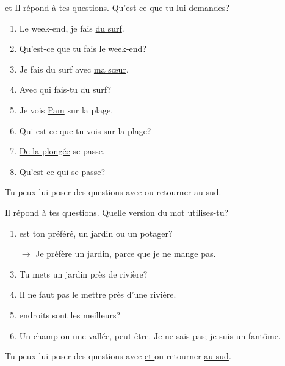 \documentclass{beamer}
\begin{document}
  \begin{frame}{ et }
    Il répond à tes questions.
    Qu'est-ce que tu lui demandes?
    \begin{enumerate}
      \item Le week-end, je fais \underline{du surf}.
      \item<2->[$\to$] Qu'est-ce que tu fais le week-end?
      \item<3-> Je fais du surf avec \underline{ma sœur}.
      \item<4->[$\to$] Avec qui fais-tu du surf?
      \item<5-> Je vois \underline{Pam} sur la plage.
      \item<6->[$\to$] Qui est-ce que tu vois sur la plage?
      \item<7-> \underline{De la plongée} se passe.
      \item<8->[$\to$] Qu'est-ce qui se passe?
    \end{enumerate}
    Tu peux lui poser des questions avec \hyperlink{quel}{} ou retourner \hyperlink{début}{au sud}.
  \end{frame}

  \begin{frame}{}
    Il répond à tes questions.
    Quelle version du mot  utilises-tu?
    \begin{enumerate}
      \item \underline{} est ton préféré, un jardin ou un potager?
      \item[$\to$] Je préfère un jardin, parce que je ne mange pas.
      \item<3-> Tu mets un jardin près de \underline{} rivière?
      \item<3->[$\to$] Il ne faut pas le mettre près d'une rivière.
      \item<5-> \underline{} endroits sont les meilleurs?
      \item<5->[$\to$] Un champ ou une vallée, peut-être. Je ne sais pas; je suis un fantôme.
    \end{enumerate}
    Tu peux lui poser des questions avec \hyperlink{que}{ et } ou retourner \hyperlink{début}{au sud}.
  \end{frame}
\end{document}
